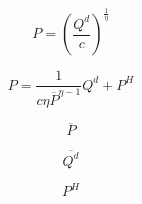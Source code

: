 \begin{equation}
P= (\frac{Q^d}{c})^\frac{1}{\eta} 
\end{equation}

\begin{equation}
P= \frac{1}{c\eta\overline{P}^{\eta - 1}}Q^d + P^H
\end{equation}


\begin{equation}
\overline{P}
\end{equation}


\begin{equation}
\overline{Q^d}
\end{equation}

\begin{equation}
P^H
\end{equation}


